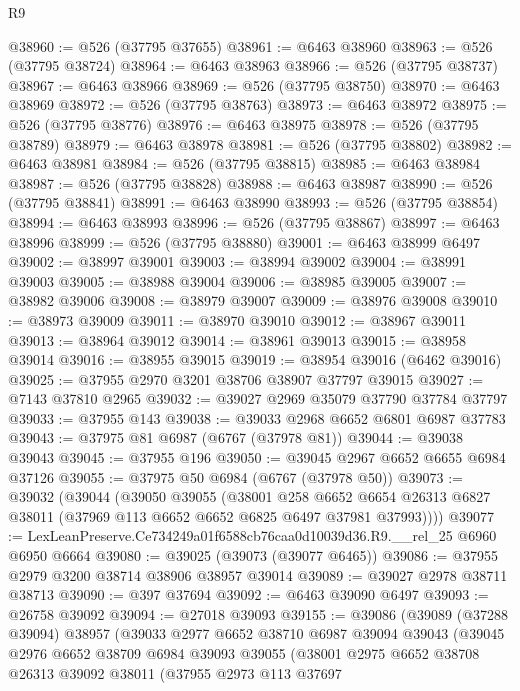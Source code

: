 \begin{lexlean}{R9}
\begin{coremodule}
@38960 := @526 (@37795 @37655)
@38961 := @6463 @38960
@38963 := @526 (@37795 @38724)
@38964 := @6463 @38963
@38966 := @526 (@37795 @38737)
@38967 := @6463 @38966
@38969 := @526 (@37795 @38750)
@38970 := @6463 @38969
@38972 := @526 (@37795 @38763)
@38973 := @6463 @38972
@38975 := @526 (@37795 @38776)
@38976 := @6463 @38975
@38978 := @526 (@37795 @38789)
@38979 := @6463 @38978
@38981 := @526 (@37795 @38802)
@38982 := @6463 @38981
@38984 := @526 (@37795 @38815)
@38985 := @6463 @38984
@38987 := @526 (@37795 @38828)
@38988 := @6463 @38987
@38990 := @526 (@37795 @38841)
@38991 := @6463 @38990
@38993 := @526 (@37795 @38854)
@38994 := @6463 @38993
@38996 := @526 (@37795 @38867)
@38997 := @6463 @38996
@38999 := @526 (@37795 @38880)
@39001 := @6463 @38999 @6497
@39002 := @38997 @39001
@39003 := @38994 @39002
@39004 := @38991 @39003
@39005 := @38988 @39004
@39006 := @38985 @39005
@39007 := @38982 @39006
@39008 := @38979 @39007
@39009 := @38976 @39008
@39010 := @38973 @39009
@39011 := @38970 @39010
@39012 := @38967 @39011
@39013 := @38964 @39012
@39014 := @38961 @39013
@39015 := @38958 @39014
@39016 := @38955 @39015
@39019 := @38954 @39016 (@6462 @39016)
@39025 := @37955 @2970 @3201 @38706 @38907 @37797 @39015
@39027 := @7143 @37810 @2965
@39032 := @39027 @2969 @35079 @37790 @37784 @37797
@39033 := @37955 @143
@39038 := @39033 @2968 @6652 @6801 @6987 @37783
@39043 := @37975 @81 @6987 (@6767 (@37978 @81))
@39044 := @39038 @39043
@39045 := @37955 @196
@39050 := @39045 @2967 @6652 @6655 @6984 @37126
@39055 := @37975 @50 @6984 (@6767 (@37978 @50))
@39073 := @39032
    (@39044
      (@39050
        @39055
        (@38001
          @258
          @6652
          @6654
          @26313
          @6827
          @38011
          (@37969 @113 @6652 @6652 @6825 @6497 @37981 @37993))))
@39077 := LexLeanPreserve.Ce734249a01f6588cb76caa0d10039d36.R9.__rel_25 @6960 @6950 @6664
@39080 := @39025 (@39073 (@39077 @6465))
@39086 := @37955 @2979 @3200 @38714 @38906 @38957 @39014
@39089 := @39027 @2978 @38711 @38713
@39090 := @397 @37694
@39092 := @6463 @39090 @6497
@39093 := @26758 @39092
@39094 := @27018 @39093
@39155 := @39086
    (@39089
      (@37288 @39094)
      @38957
      (@39033
        @2977
        @6652
        @38710
        @6987
        @39094
        @39043
        (@39045
          @2976
          @6652
          @38709
          @6984
          @39093
          @39055
          (@38001
            @2975
            @6652
            @38708
            @26313
            @39092
            @38011
            (@37955
              @2973
              @113
              @37697

\end{coremodule}
\end{lexlean}
